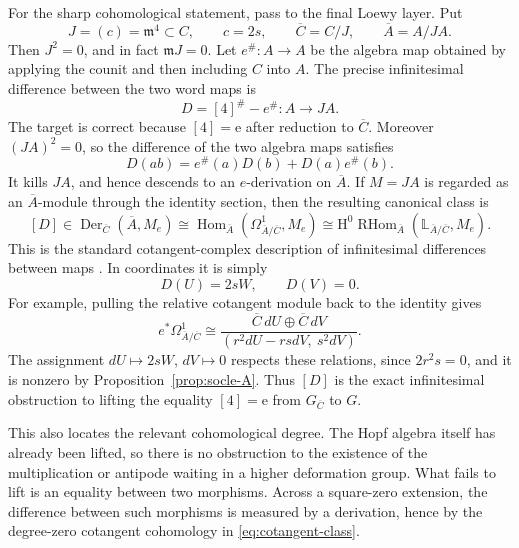 \documentclass[11pt]{amsart}
\theoremstyle{definition}
\theoremstyle{remark}
\newcommand{\m}{\mathfrak m}
\newcommand{\unit}{\mathrm e}
\begin{document}
For the sharp cohomological statement, pass to the final Loewy layer.  Put
\begin{equation}\label{eq:minimal-square-zero}
 J=(c)=\m^4\subset C,
 \qquad c=2s,
 \qquad \overline C=C/J,
 \qquad \overline A=A/JA.
\end{equation}
Then \(J^2=0\), and in fact \(\m J=0\).  Let
\(e^\#\colon A\to A\) be the algebra map obtained by applying the counit
and then including \(C\) into \(A\).  The precise infinitesimal difference
between the two word maps is
\begin{equation}\label{eq:obstruction-derivation}
 D=[4]^\#-e^\#\colon A\longrightarrow JA.
\end{equation}
The target is correct because \([4]=\unit\) after reduction to
\(\overline C\).  Moreover \((JA)^2=0\), so the difference of the two
algebra maps satisfies
\begin{equation}\label{eq:e-derivation}
 D(ab)=e^\#(a)D(b)+D(a)e^\#(b).
\end{equation}
It kills \(JA\), and hence descends to an \(e\)-derivation on
\(\overline A\).  If \(M=JA\) is regarded as an \(\overline A\)-module
through the identity section, then the resulting canonical class is
\begin{equation}\label{eq:cotangent-class}
 [D]\in
 \operatorname{Der}_{\overline C}(\overline A,M_e)
 \cong
 \operatorname{Hom}_{\overline A}
       (\Omega^1_{\overline A/\overline C},M_e)
 \cong
 \mathrm H^0\operatorname{RHom}_{\overline A}
       (\mathbb L_{\overline A/\overline C},M_e).
\end{equation}
This is the standard cotangent-complex description of infinitesimal
differences between maps \cite{IllusieCotangent}.
In coordinates it is simply
\begin{equation}\label{eq:class-coordinates}
 D(U)=2sW,
 \qquad
 D(V)=0.
\end{equation}
For example, pulling the relative cotangent module back to the identity
gives
\[
 e^*\Omega^1_{\overline A/\overline C}
 \cong
 \frac{\overline C\,dU\oplus\overline C\,dV}
      {(r^2dU-rsdV,\ s^2dV)}.
\]
The assignment \(dU\mapsto2sW\), \(dV\mapsto0\) respects these relations,
since \(2r^2s=0\), and it is nonzero by
Proposition~\ref{prop:socle-A}.  Thus \([D]\) is the exact infinitesimal
obstruction to lifting the equality \([4]=\unit\) from
\(G_{\overline C}\) to \(G\).

This also locates the relevant cohomological degree.  The Hopf algebra
itself has already been lifted, so there is no obstruction to the existence
of the multiplication or antipode waiting in a higher deformation group.
What fails to lift is an equality between two morphisms.  Across a
square-zero extension, the difference between such morphisms is measured
by a derivation, hence by the degree-zero cotangent cohomology in
\eqref{eq:cotangent-class}.
\end{document}
